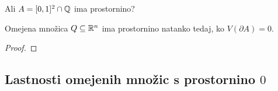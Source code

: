 \begin{zgled}
    Ali \(A = [0,1]^2 \cap \mathbb{Q}\) ima prostornino?
\end{zgled}

\begin{trditev}
    Omejena množica \(Q \subseteq \mathbb{R}^n\) ima prostornino natanko tedaj, ko \(V(\partial A) = 0\).
\end{trditev}

\begin{proof}
    \todo
\end{proof}

\begin{zgled}
    \todo
\end{zgled}

\subsection{Lastnosti omejenih množic s prostornino \(0\)}

